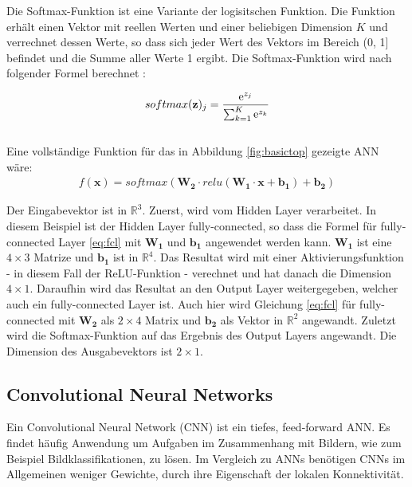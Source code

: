 Die Softmax-Funktion ist eine Variante der logisitschen Funktion. Die Funktion erh\"alt einen Vektor  mit reellen Werten und einer beliebigen Dimension $K$ und verrechnet dessen Werte, so dass sich jeder Wert des Vektors  im Bereich (0, 1] befindet und die Summe aller Werte 1 ergibt. Die Softmax-Funktion wird nach folgender Formel berechnet \parencite{Goodfellow-et-al-2016}:

\begin{equation}
softmax(\textbf{z})_j = \frac{\mathrm{e}^{z_j}}{\sum_{k=1}^K \mathrm{e}^{z_k}}
\end{equation}
\\

Eine vollständige Funktion f\"ur das in Abbildung \ref{fig:basictop} gezeigte ANN w\"are:
\begin{multline*}
f(\mathbf{x}) = softmax(\mathbf{W_2} \cdot relu(\mathbf{W_1} \cdot \mathbf{x} + \mathbf{b_1}) + \mathbf{b_2} )
\end{multline*}


Der Eingabevektor  ist in $\mathbb{R}^3$. Zuerst, wird  vom Hidden Layer verarbeitet. In diesem Beispiel ist der Hidden Layer fully-connected, so dass die Formel f\"ur fully-connected Layer \ref{eq:fcl} mit $\mathbf{W_1}$ und $\mathbf{b_1}$ angewendet werden kann. $\mathbf{W_1}$ ist eine $4 \times 3$ Matrize und $\mathbf{b_1}$ ist in $\mathbb{R}^4$. Das Resultat wird mit einer Aktivierungsfunktion - in diesem Fall der ReLU-Funktion - verechnet und hat danach die Dimension $4\times1$. Daraufhin wird das Resultat an den Output Layer weitergegeben, welcher auch ein fully-connected Layer ist. Auch hier wird Gleichung \ref{eq:fcl} f\"ur fully-connected mit $\mathbf{W_2}$ als $2\times4$ Matrix und $\mathbf{b_2}$ als Vektor in $\mathbb{R}^2$ angewandt. Zuletzt wird die Softmax-Funktion auf das Ergebnis des Output Layers angewandt. Die Dimension des Ausgabevektors ist $2\times1$.


\subsection{Convolutional Neural Networks}

\label{cnn}

Ein Convolutional Neural Network (CNN) ist ein tiefes, feed-forward ANN. Es findet h\"aufig  Anwendung um Aufgaben im Zusammenhang mit Bildern, wie zum Beispiel Bildklassifikationen, zu l\"osen. Im Vergleich zu ANNs ben\"otigen CNNs im Allgemeinen weniger Gewichte, durch ihre Eigenschaft der lokalen Konnektivit\"at.

